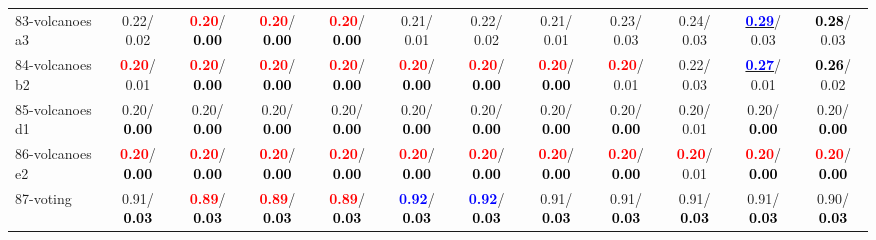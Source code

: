 \begin{table}[h]
\begin{center}
{\begin{tabular}{lc|c|c|c|c|c|c|c|c|c|c}
83-volcanoes a3 &   0.22/  0.02 & \textcolor{red}{\textbf{  0.20}}/\textcolor{black}{\textbf{  0.00}} & \textcolor{red}{\textbf{  0.20}}/\textcolor{black}{\textbf{  0.00}} & \textcolor{red}{\textbf{  0.20}}/\textcolor{black}{\textbf{  0.00}} &   0.21/  0.01 &   0.22/  0.02 &   0.21/  0.01 &   0.23/  0.03 &   0.24/  0.03 & \underline{\textcolor{blue}{\textbf{  0.29}}}/  0.03 & \textcolor{black}{\textbf{  0.28}}/  0.03 \\
84-volcanoes b2 & \textcolor{red}{\textbf{  0.20}}/  0.01 & \textcolor{red}{\textbf{  0.20}}/\textcolor{black}{\textbf{  0.00}} & \textcolor{red}{\textbf{  0.20}}/\textcolor{black}{\textbf{  0.00}} & \textcolor{red}{\textbf{  0.20}}/\textcolor{black}{\textbf{  0.00}} & \textcolor{red}{\textbf{  0.20}}/\textcolor{black}{\textbf{  0.00}} & \textcolor{red}{\textbf{  0.20}}/\textcolor{black}{\textbf{  0.00}} & \textcolor{red}{\textbf{  0.20}}/\textcolor{black}{\textbf{  0.00}} & \textcolor{red}{\textbf{  0.20}}/  0.01 &   0.22/  0.03 & \underline{\textcolor{blue}{\textbf{  0.27}}}/  0.01 & \textcolor{black}{\textbf{  0.26}}/  0.02 \\
85-volcanoes d1 &   0.20/\textcolor{black}{\textbf{  0.00}} &   0.20/\textcolor{black}{\textbf{  0.00}} &   0.20/\textcolor{black}{\textbf{  0.00}} &   0.20/\textcolor{black}{\textbf{  0.00}} &   0.20/\textcolor{black}{\textbf{  0.00}} &   0.20/\textcolor{black}{\textbf{  0.00}} &   0.20/\textcolor{black}{\textbf{  0.00}} &   0.20/\textcolor{black}{\textbf{  0.00}} &   0.20/  0.01 &   0.20/\textcolor{black}{\textbf{  0.00}} &   0.20/\textcolor{black}{\textbf{  0.00}} \\ \hline
86-volcanoes e2 & \textcolor{red}{\textbf{  0.20}}/\textcolor{black}{\textbf{  0.00}} & \textcolor{red}{\textbf{  0.20}}/\textcolor{black}{\textbf{  0.00}} & \textcolor{red}{\textbf{  0.20}}/\textcolor{black}{\textbf{  0.00}} & \textcolor{red}{\textbf{  0.20}}/\textcolor{black}{\textbf{  0.00}} & \textcolor{red}{\textbf{  0.20}}/\textcolor{black}{\textbf{  0.00}} & \textcolor{red}{\textbf{  0.20}}/\textcolor{black}{\textbf{  0.00}} & \textcolor{red}{\textbf{  0.20}}/\textcolor{black}{\textbf{  0.00}} & \textcolor{red}{\textbf{  0.20}}/\textcolor{black}{\textbf{  0.00}} & \textcolor{red}{\textbf{  0.20}}/  0.01 & \textcolor{red}{\textbf{  0.20}}/\textcolor{black}{\textbf{  0.00}} & \textcolor{red}{\textbf{  0.20}}/\textcolor{black}{\textbf{  0.00}} \\
87-voting &   0.91/\textcolor{black}{\textbf{  0.03}} & \textcolor{red}{\textbf{  0.89}}/\textcolor{black}{\textbf{  0.03}} & \textcolor{red}{\textbf{  0.89}}/\textcolor{black}{\textbf{  0.03}} & \textcolor{red}{\textbf{  0.89}}/\textcolor{black}{\textbf{  0.03}} & \textcolor{blue}{\textbf{  0.92}}/\textcolor{black}{\textbf{  0.03}} & \textcolor{blue}{\textbf{  0.92}}/\textcolor{black}{\textbf{  0.03}} &   0.91/\textcolor{black}{\textbf{  0.03}} &   0.91/\textcolor{black}{\textbf{  0.03}} &   0.91/\textcolor{black}{\textbf{  0.03}} &   0.91/\textcolor{black}{\textbf{  0.03}} &   0.90/\textcolor{black}{\textbf{  0.03}} \\

\end{tabular}}
\end{center}
\end{table}
